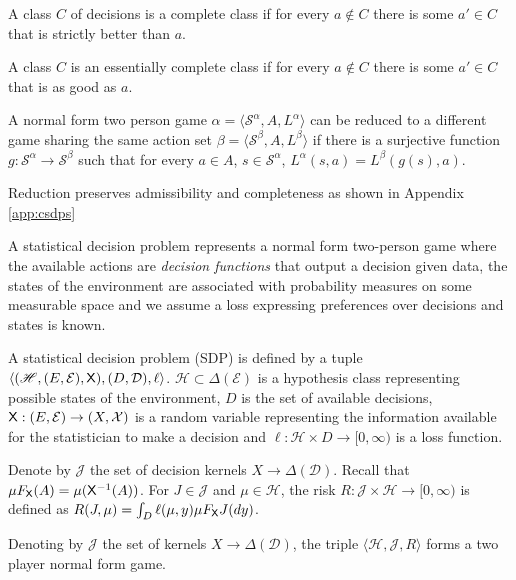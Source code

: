 \begin{definition}
A class $C$ of decisions is a complete class if for every $a\not\in C$ there is some $a'\in C$ that is strictly better than $a$.

A class $C$ is an essentially complete class if for every $a\not\in C$ there is some $a'\in C$ that is as good as $a$.
\end{definition}

\begin{definition}[Reduction]\label{def:red_sdp_CSDP}
A normal form two person game $\alpha = \langle \mathscr{S}^\alpha, A, L^\alpha\rangle$ can be reduced to a different game sharing the same action set $\beta = \langle \mathscr{S}^\beta, A, L^\beta \rangle$ if there is a surjective function $g:\mathscr{S}^\alpha\to \mathscr{S}^\beta$ such that for every $a\in A$, $s\in \mathscr{S}^\alpha$, $L^\alpha(s,a) = L^\beta(g(s),a)$.
\end{definition}

Reduction preserves admissibility and completeness as shown in Appendix \ref{app:csdps}

A statistical decision problem represents a normal form two-person game where the available actions are \emph{decision functions} that output a decision given data, the states of the environment are associated with probability measures on some measurable space and we assume a loss expressing preferences over decisions and states is known.

\begin{definition}
A statistical decision problem (SDP) is defined by a tuple $\langle (\mathscr{H},(E,\mathcal{E}), \mathsf{X}), (D,\mathcal{D}), \ell\rangle$. $\mathscr{H}\subset\Delta(\mathcal{E})$ is a hypothesis class representing possible states of the environment, $D$ is the set of available decisions, $\mathsf{X}:(E,\mathcal{E})\to (X,\mathcal{X})$ is a random variable representing the information available for the statistician to make a decision and $\ell:\mathcal{H}\times D\to [0,\infty)$ is a loss function.

Denote by $\mathscr{J}$ the set of decision kernels $X\to \Delta(\mathcal{D})$. Recall that $\mu F_{\mathsf{X}}(A)=\mu(\mathsf{X}^{-1}(A))$. For $J\in \mathscr{J}$ and $\mu\in \mathcal{H}$, the risk $R:\mathscr{J}\times\mathscr{H}\to [0,\infty)$ is defined as $R(J,\mu) = \int_D \ell(\mu,y) \mu F_{\mathsf{X}} J(dy)$.

Denoting by $\mathscr{J}$  the set of kernels $X\to \Delta(\mathcal{D})$, the triple $\langle \mathscr{H}, \mathscr{J}, R\rangle$ forms a two player normal form game.
\end{definition}


